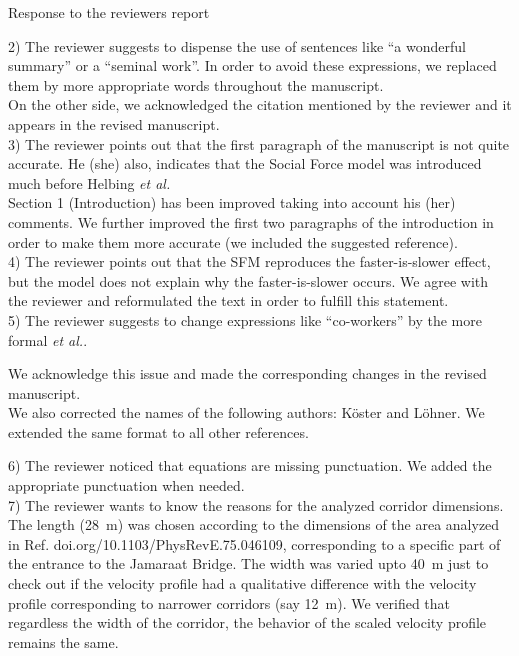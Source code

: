 \documentclass[a4paper,12pt]{letter}
\begin{document}
\begin{letter}{Response to the reviewers report}
{2) The reviewer suggests to dispense the use of sentences like ``a wonderful 
summary'' or a ``seminal work''. In order to avoid these expressions, we 
replaced them by more appropriate words throughout the manuscript. \\

On the other side, we acknowledged the citation mentioned by the reviewer and 
it appears in the revised manuscript. \\

3) The reviewer points out that the first paragraph of the manuscript is not 
quite accurate. He (she) also, indicates that the Social Force model was introduced much 
before Helbing \textit{et al.} \\

Section 1 (Introduction) has been improved taking into account his (her) 
comments. We further improved the first two paragraphs of the introduction in order to 
make them more accurate (we included the suggested reference). \\ 

4) The reviewer points out that the SFM reproduces the faster-is-slower effect, but the model
does not explain why the faster-is-slower occurs. We agree with the reviewer and reformulated 
the text in order to fulfill this statement.\\

5) The reviewer suggests to change expressions like ``co-workers'' by 
the more formal \textit{et al.}. 

We acknowledge this issue and made the corresponding changes in the
revised manuscript. \\

We also corrected the names of the following authors: K\"oster and L\"ohner. We extended the same format to all other references.   

6) The reviewer noticed that equations are missing punctuation. We added the appropriate punctuation when needed. \\

7) The reviewer wants to know the reasons for the analyzed corridor dimensions. 
\\

The length (28~m) was chosen according to the dimensions of the area analyzed
in Ref. doi.org/10.1103/PhysRevE.75.046109,  corresponding to a specific part 
of the entrance to the Jamaraat Bridge. 
The width was varied upto 40~m just to check out if the velocity profile had a
qualitative difference with the velocity profile corresponding to narrower 
corridors (say 12~m). We verified that regardless the width of the corridor, 
the behavior of the scaled velocity profile remains the same. 

}
\end{letter}
\end{document}
